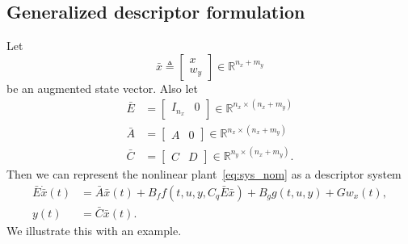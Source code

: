 \documentclass[times, doublespace]{rncauth}
\begin{document}
\subsection{Generalized descriptor formulation}
Let
\[
\bar x \triangleq \begin{bmatrix}
x \\ w_y
\end{bmatrix} \in \mathbb{R}^{n_x+m_y}
\]
be an augmented state vector. Also let \begin{align*}
\bar E &= \begin{bmatrix}
I_{n_x} & 0
\end{bmatrix}\in\mathbb{R}^{n_x\times (n_x+m_y)}\\
\bar A &= \begin{bmatrix}
A & 0
\end{bmatrix}\in\mathbb{R}^{n_x\times (n_x+m_y)}\\
\bar C &= \begin{bmatrix}
C & D
\end{bmatrix}\in\mathbb{R}^{n_y\times (n_x+m_y)}.
\end{align*}
Then we can represent the nonlinear plant~\eqref{eq:sys_nom} as a descriptor system
\begin{subequations}
	\label{eq:descr_sys}
	\begin{align}
	\label{eq:descr_sys_a}
	\bar E\dot{\bar x}(t) &= \bar A \bar x(t)+ B_f f(t,u,y, C_q\bar E\bar x) + B_g g(t,u,y) + G w_x(t),\\
	y(t) &= \bar C \bar x(t).
	\end{align}
\end{subequations}
We illustrate this with an example.
\end{document}
